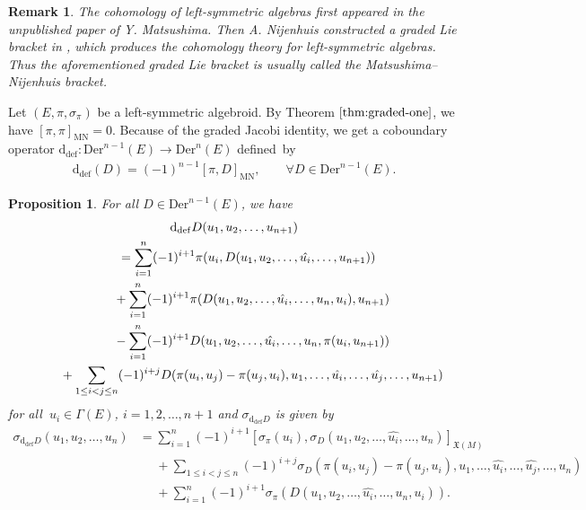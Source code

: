 \documentclass[10pt,a4paper]{amsart}
\numberwithin{equation}{section}
\newtheorem{pro}[thm]{Proposition}
\newtheorem{rmk}[thm]{Remark}
\newcommand{\frkX}{\mathfrak X}
\newcommand{\dM}{\mathrm{d}}
\newcommand{\Der}{\mathrm{Der}}
\newcommand{\MN}{\mathrm{MN}}
\newcommand{\Def}{\mathrm{def}}
\begin{document}
\begin{rmk}
The cohomology of left-symmetric algebras first appeared in the unpublished paper of Y. Matsushima. Then A. Nijenhuis constructed a graded Lie bracket in \cite{Nijenhuis}, which produces the cohomology theory for left-symmetric algebras. Thus the aforementioned graded Lie bracket is usually called the Matsushima--Nijenhuis bracket.	
\end{rmk}	

Let $(E,\pi,\sigma_\pi)$ be a left-symmetric algebroid. By Theorem $\ref{thm:graded-one}$, we have $[\pi,\pi]_{\MN}=0$. Because of the graded Jacobi identity, we get a coboundary operator $\dM_{\Def}\colon \Der^{n-1}(E)\rightarrow \Der^n(E)$ defi\-ned~by
\begin{gather*}
\dM_{\Def}(D)=(-1)^{n-1}[\pi,D]_{\MN}, \qquad
\forall D\in\Der^{n-1}(E).
\end{gather*}

\begin{pro}%
For all $D\in\Der^{n-1}(E)$, we have
\begin{gather}
\dM_{\Def}D(u_1,u_2,\dots,u_{n+1})\nonumber
\\ \qquad
{} =\sum_{i=1}^{n}(-1)^{i+1}\pi(u_i,D(u_1,u_2,\dots,\hat{u_i},\dots,u_{n+1}))\nonumber
\\ \qquad\hphantom{=}
{}+\sum_{i=1}^{n}(-1)^{i+1}\pi(D(u_1,u_2,\dots,\hat{u_i},\dots,u_n,u_i), u_{n+1})\nonumber
\\ \qquad\hphantom{=}
{}-\sum_{i=1}^{n}(-1)^{i+1}D(u_1,u_2,\dots,\hat{u_i},\dots,u_n,\pi(u_i, u_{n+1}))\nonumber
\\ \qquad\hphantom{=}
{}+\sum_{1\leq i<j\leq {n}}(-1)^{i+j}D(\pi(u_i,u_j)-\pi(u_j,u_i),u_1,\dots,\hat{u_i},\dots,\hat{u_j},\dots,u_{n+1})
\label{eq:deformation complex}
\end{gather}
for all $\ u_i\in \Gamma(E)$, $i=1,2,\dots,n+1$ and $\sigma_{\dM_{\Def}D}$
is given by
\begin{align*}
\sigma_{\dM_{\Def}D}(u_1,u_2,\dots,u_n)&= \sum_{i=1}^{n}(-1)^{i+1}[\sigma_\pi(u_i),\sigma_{D}(u_1,u_2,\dots,\hat{u_i},\dots,u_{n})]_{\frkX(M)}
\\
&\phantom{=}+\!\!\!\sum_{1\leq i<j\leq n}\!\!\! (-1)^{i+j}\sigma_{D}(\pi(u_i,u_j)-\pi(u_j,u_i),u_1,\dots,\hat{u_i},\dots,\hat{u_j},\dots,u_n)
\\
&\phantom{=}+\sum_{i=1}^{n}(-1)^{i+1}\sigma_\pi(D(u_1,u_2,\dots,\hat{u_i},\dots,u_n,u_i)).
\end{align*}
\end{pro}
\end{document}
